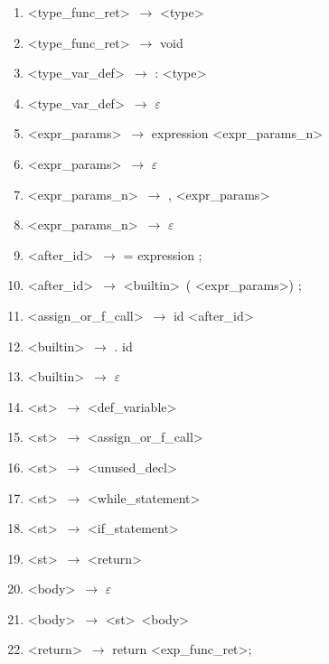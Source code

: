 \documentclass[a4paper, 11pt]{article}
\begin{document}
\begin{figure}[ht]
\begin{center}
\begin{enumerate}
        \item \textless type\_func\_ret\textgreater\ $\to$ \textless type\textgreater
        \item \textless type\_func\_ret\textgreater\ $\to$ void
        \item \textless type\_var\_def\textgreater\ $\to$ : \textless type\textgreater
        \item \textless type\_var\_def\textgreater\ $\to$ $\varepsilon$
        \item \textless expr\_params\textgreater\ $\to$ expression \textless expr\_params\_n\textgreater
        \item \textless expr\_params\textgreater\ $\to$ $\varepsilon$
        \item \textless expr\_params\_n\textgreater\ $\to$ , \textless expr\_params\textgreater
        \item \textless expr\_params\_n\textgreater\ $\to$ $\varepsilon$
        \item \textless after\_id\textgreater\ $\to$ = expression ;
        \item \textless after\_id\textgreater\ $\to$ \textless builtin\textgreater\ ( \textless expr\_params\textgreater ) ;
        \item \textless assign\_or\_f\_call\textgreater\ $\to$ id \textless after\_id\textgreater
        \item \textless builtin\textgreater\ $\to$ . id
        \item \textless builtin\textgreater\ $\to$ $\varepsilon$
        \item \textless st\textgreater\ $\to$ \textless def\_variable\textgreater
        \item \textless st\textgreater\ $\to$ \textless assign\_or\_f\_call\textgreater
        \item \textless st\textgreater\ $\to$ \textless unused\_decl\textgreater
        \item \textless st\textgreater\ $\to$ \textless while\_statement\textgreater
        \item \textless st\textgreater\ $\to$ \textless if\_statement\textgreater
        \item \textless st\textgreater\ $\to$ \textless return\textgreater
        \item \textless body\textgreater\ $\to$ $\varepsilon$
        \item \textless body\textgreater\ $\to$ \textless st\textgreater\ \textless body\textgreater
        \item \textless return\textgreater\ $\to$ return \textless exp\_func\_ret\textgreater  ;

\end{enumerate}
\end{center}
\end{figure}
\end{document}
